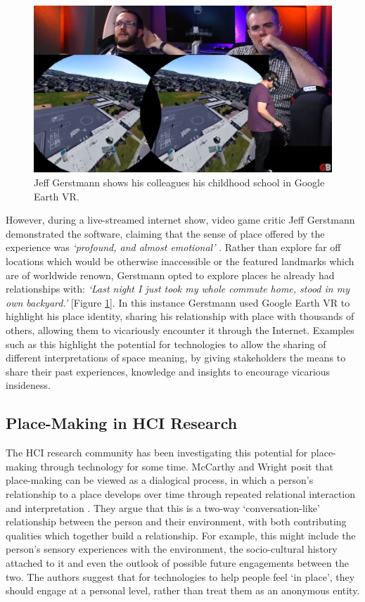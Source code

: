 \begin{figure}
  \centering
  \includegraphics[width=0.8\columnwidth]{images/chapter02/googleEarth.PNG}
  \caption[Jeff Gerstmann showing Google Earth VR]{Jeff Gerstmann shows his colleagues his childhood school in Google Earth VR.}
  \label{fig:googleEarth}
\end{figure}

However, during a live-streamed internet show, video game critic Jeff Gerstmann demonstrated the software, claiming that the sense of place offered by the experience was \textit{`profound, and almost emotional'} \citep{Gerstmann2016}. Rather than explore far off locations which would be otherwise inaccessible or the featured landmarks which are of worldwide renown, Gerstmann opted to explore places he already had relationships with: \textit{`Last night I just took my whole commute home, stood in my own backyard.'} [Figure \ref{fig:googleEarth}]. In this instance Gerstmann used Google Earth VR to highlight his place identity, sharing his relationship with place with thousands of others, allowing them to vicariously encounter it through the Internet. Examples such as this highlight the potential for technologies to allow the sharing of different interpretations of space meaning, by giving stakeholders the means to share their past experiences, knowledge and insights to encourage vicarious insideness.

\subsection{Place-Making in HCI Research}
\label{sec:PlaceMakingHCI}

The HCI research community has been investigating this potential for place-making through technology for some time. McCarthy and Wright posit that place-making can be viewed as a dialogical process, in which a person's relationship to a place develops over time through repeated relational interaction and interpretation \citep{McCarthy2005}. They argue that this is a two-way `conversation-like' relationship between the person and their environment, with both contributing qualities which together build a relationship. For example, this might include the person's sensory experiences with the environment, the socio-cultural history attached to it and even the outlook of possible future engagements between the two. The authors suggest that for technologies to help people feel `in place', they should engage at a personal level, rather than treat them as an anonymous entity. 

